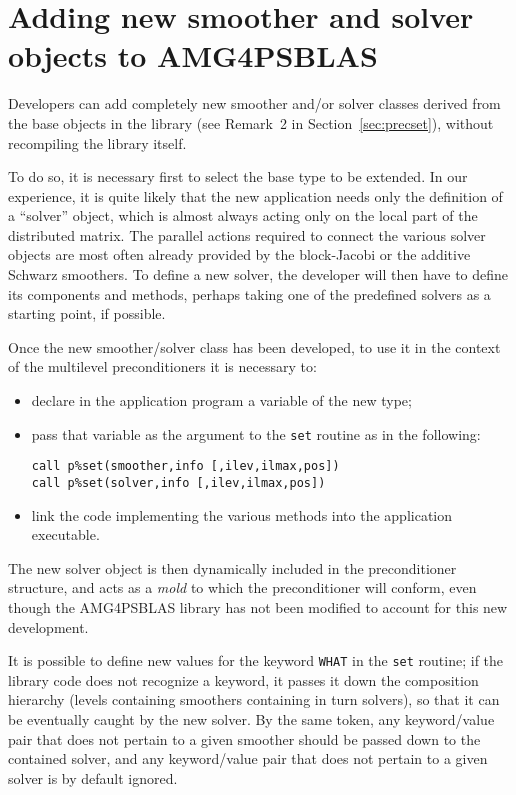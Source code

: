 
\clearpage

\section{Adding new smoother and solver objects to AMG4PSBLAS\label{sec:adding}}

Developers can add completely new smoother and/or solver classes
derived from the base objects in the library (see Remark~2 in Section~\ref{sec:precset}),
without recompiling the library itself.

To do so, it is necessary first to select the base type to be extended.
In our experience, it is quite likely that the new application needs
only the definition of a ``solver'' object, which is almost
always acting only on the local part of the distributed matrix.
The parallel actions required to connect the various solver objects
are most often already provided by the block-Jacobi or the additive
Schwarz smoothers.  To define a new solver, the developer will then
have to define its components and methods, perhaps taking one of the
predefined solvers as a starting point, if possible.

Once the new smoother/solver class has been developed, to use it in
the context of the multilevel preconditioners it is necessary to:
\begin{itemize}
\item declare in the application program a variable of the new type;
\item  pass that variable as the argument to the \verb|set| routine as in the
following:
\begin{center}
\verb|call p%set(smoother,info [,ilev,ilmax,pos])|\\
\verb|call p%set(solver,info [,ilev,ilmax,pos])|
\end{center}
\item link the code implementing the various methods into the application executable.
\end{itemize}
The new solver object is then dynamically included in the
preconditioner structure, and acts as a \emph{mold} to which the
preconditioner will conform, even though the AMG4PSBLAS library has not
been modified to account for this new development.

It is possible to define new values for the keyword \verb|WHAT| in the
\verb|set| routine; if the library code does not recognize a keyword,
it passes it down the composition hierarchy (levels containing
smoothers containing in turn solvers), so that it can be eventually caught by
the new solver. By the same token, any keyword/value pair that does not pertain to
a given smoother should be passed down to the contained solver, and
any keyword/value pair that does not pertain to a given solver is by
default ignored.

